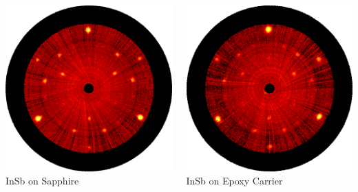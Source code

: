 \documentclass[]{beamer}%
\begin{document}
\begin{frame}
    \begin{columns}
        \begin{column}{0.5\textwidth}
            \centering
            \includegraphics[width=\textwidth]{graphics/mbeoxide_InSbSaph2} \\ InSb on Sapphire
        \end{column}
        \begin{column}{0.5\textwidth}
            \centering
            \includegraphics[width=\textwidth]{graphics/mbeoxide_InSbSpaph2liftoff} \\ InSb on Epoxy Carrier
        \end{column}
    \end{columns}
\end{frame}
\end{document}
